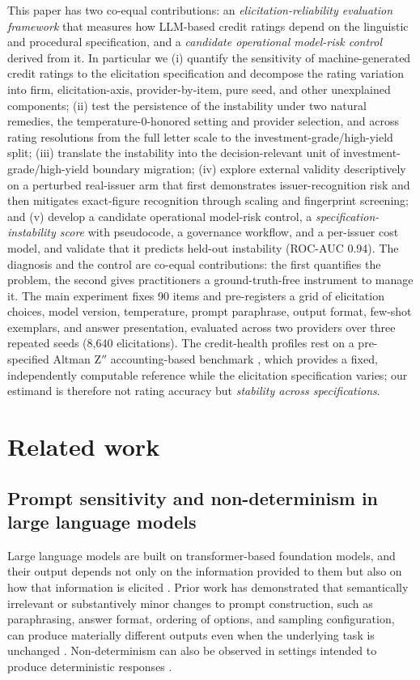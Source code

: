 \documentclass[a4paper,fleqn]{cas-sc}
\begin{document}
This paper has two co-equal contributions: an \emph{elicitation-reliability evaluation framework} that
measures how LLM-based credit ratings depend on the linguistic and procedural specification, and a
\emph{candidate operational model-risk control} derived from it. In particular we (i) quantify the
sensitivity of machine-generated credit ratings to the elicitation specification and decompose the
rating variation into firm, elicitation-axis, provider-by-item, pure seed, and other unexplained
components; (ii) test the persistence of the instability under two natural remedies, the temperature-0-honored
setting and provider selection, and across rating resolutions from the full letter scale to the
investment-grade/high-yield split; (iii) translate the instability into the decision-relevant unit of
investment-grade/high-yield boundary migration;
(iv) explore external validity descriptively on a perturbed real-issuer arm that first demonstrates
issuer-recognition risk and then mitigates exact-figure recognition through scaling and fingerprint
screening; and (v) develop a candidate operational model-risk control, a
\emph{specification-instability score} with pseudocode, a governance workflow, and a per-issuer cost
model, and validate that it predicts held-out instability (ROC-AUC 0.94). The diagnosis and the control
are co-equal contributions: the first quantifies the problem, the second gives practitioners a
ground-truth-free instrument to manage it.
The main experiment fixes 90 items and pre-registers a grid of elicitation choices, model version,
temperature, prompt paraphrase, output format, few-shot exemplars, and answer presentation, evaluated
across two providers over three repeated seeds (8{,}640 elicitations). The credit-health profiles rest on
a pre-specified Altman Z$''$ accounting-based benchmark \citep{altman1968}, which provides a fixed,
independently computable reference while the elicitation specification varies; our estimand is therefore
not rating accuracy but \emph{stability across specifications}.

\section{Related work}
\subsection{Prompt sensitivity and non-determinism in large language models}
Large language models are built on transformer-based foundation models, and their output depends not only
on the information provided to them but also on how that information is elicited
\citep{vaswani2017attention,devlin2019bert,bommasani2021foundation}. Prior work has demonstrated that
semantically irrelevant or substantively minor changes to prompt construction, such as paraphrasing,
answer format, ordering of options, and sampling configuration, can produce materially different outputs
even when the underlying task is unchanged \citep{atil2024nondeterminism,sclar2024formatspread}.
Non-determinism can also be observed in settings intended to produce deterministic responses
\citep{atil2024nondeterminism}.
\end{document}
